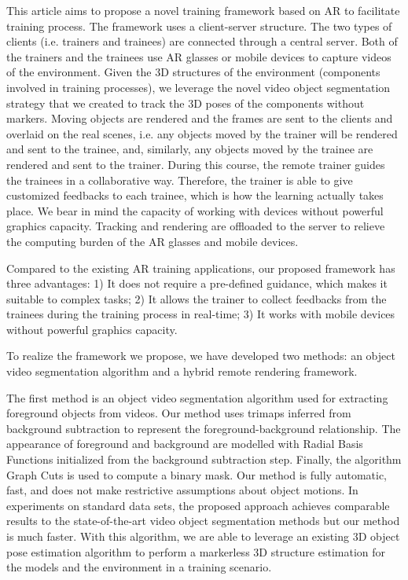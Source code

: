 This article aims to propose a novel training framework based on AR to facilitate training process.
The framework uses a client-server structure. The two types of clients (i.e. trainers and trainees) are connected through a central server.
Both of the trainers and the trainees use AR glasses or mobile devices to capture videos of the environment.
Given the 3D structures of the environment (components involved in training processes), we leverage the novel video object segmentation strategy that we created to track the 3D poses of the components without markers.
Moving objects are rendered and the frames are sent to the clients and overlaid on the real scenes, i.e. any objects moved by the trainer will be rendered and sent to the trainee, and, similarly, any objects moved by the trainee are rendered and sent to the trainer.
During this course, the remote trainer guides the trainees in a collaborative way. Therefore, the trainer is able to give customized feedbacks to each trainee, which is how the learning actually takes place.
We bear in mind the capacity of working with devices without powerful graphics capacity. Tracking and rendering are offloaded to the server to relieve the computing burden of the AR glasses and mobile devices.

Compared to the existing AR training applications, our proposed framework has three advantages:
1) It does not require a pre-defined guidance, which makes it suitable to complex tasks;
2) It allows the trainer to collect feedbacks from the trainees during the training process in real-time;
3) It works with mobile devices without powerful graphics capacity.

To realize the framework we propose, we have developed two methods: an object video segmentation algorithm and a hybrid remote rendering framework.

The first method is an object video segmentation algorithm used for extracting foreground objects from videos. Our method uses trimaps inferred from background subtraction to represent the foreground-background relationship. The appearance of foreground and background are modelled with Radial Basis Functions initialized from the background subtraction step. Finally, the algorithm Graph Cuts is used to compute a binary mask. Our method is fully automatic, fast, and does not make restrictive assumptions about object motions. In experiments on standard data sets, the proposed approach achieves comparable results to the state-of-the-art video object segmentation methods but our method is much faster.
With this algorithm, we are able to leverage an existing 3D object pose estimation algorithm to perform a markerless
3D structure estimation for the models and the environment in a training scenario.

